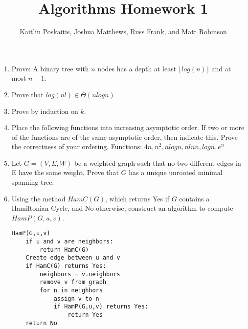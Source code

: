 \documentclass[12pt]{article}
\title{\bf Algorithms Homework 1}
\author{Kaitlin Poskaitis, Joshua Matthews, Russ Frank, and Matt Robinson}
\date{}
\begin{document}
\maketitle

\begin{enumerate}
\item Prove: A binary tree with $n$ nodes has a depth at least $\lfloor
log(n) \rfloor$ and at most $n - 1$.

\item Prove that $log(n!) \in \Theta(nlogn)$

\item Prove by induction on $k$.


\item Place the following functions into increasing asymptotic order. If two
or more of the functions are of the same asymptotic order, then indicate this.
Prove the correctness of your ordering.
Functions: $4n, n^2, nlogn, nlnn, logn, e^n$

\item Let $G = (V,E,W)$ be a weighted graph such that no two different edges
in E have the same weight. Prove that $G$ has a unique unrooted minimal spanning
tree.

\item Using the method $HamC(G)$, which returns Yes if $G$ contains a
Hamiltonian Cycle, and No otherwise, construct an algorithm to compute
$HamP(G,u,v)$.

\begin{lstlisting}
HamP(G,u,v)
    if u and v are neighbors:
        return HamC(G)
    Create edge between u and v
    if HamC(G) returns Yes:
        neighbors = v.neighbors
        remove v from graph
        for n in neighbors
            assign v to n
            if HamP(G,u,v) returns Yes:
                return Yes
    return No

\end{lstlisting}

\end{enumerate}
\end{document}
